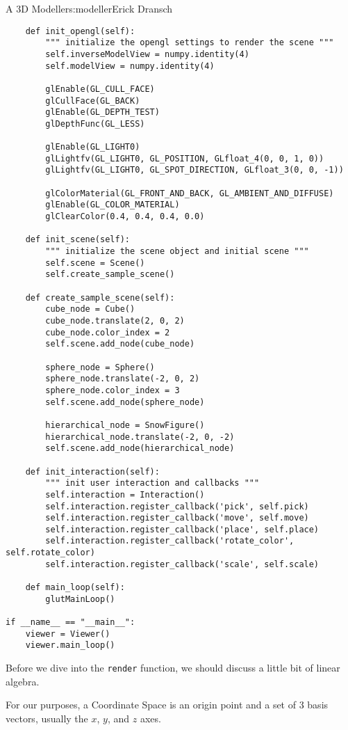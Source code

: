 \begin{aosachapter}{A 3D Modeller}{s:modeller}{Erick Dransch}
\begin{verbatim}
    def init_opengl(self):
        """ initialize the opengl settings to render the scene """
        self.inverseModelView = numpy.identity(4)
        self.modelView = numpy.identity(4)

        glEnable(GL_CULL_FACE)
        glCullFace(GL_BACK)
        glEnable(GL_DEPTH_TEST)
        glDepthFunc(GL_LESS)

        glEnable(GL_LIGHT0)
        glLightfv(GL_LIGHT0, GL_POSITION, GLfloat_4(0, 0, 1, 0))
        glLightfv(GL_LIGHT0, GL_SPOT_DIRECTION, GLfloat_3(0, 0, -1))

        glColorMaterial(GL_FRONT_AND_BACK, GL_AMBIENT_AND_DIFFUSE)
        glEnable(GL_COLOR_MATERIAL)
        glClearColor(0.4, 0.4, 0.4, 0.0)

    def init_scene(self):
        """ initialize the scene object and initial scene """
        self.scene = Scene()
        self.create_sample_scene()

    def create_sample_scene(self):
        cube_node = Cube()
        cube_node.translate(2, 0, 2)
        cube_node.color_index = 2
        self.scene.add_node(cube_node)

        sphere_node = Sphere()
        sphere_node.translate(-2, 0, 2)
        sphere_node.color_index = 3
        self.scene.add_node(sphere_node)

        hierarchical_node = SnowFigure()
        hierarchical_node.translate(-2, 0, -2)
        self.scene.add_node(hierarchical_node)

    def init_interaction(self):
        """ init user interaction and callbacks """
        self.interaction = Interaction()
        self.interaction.register_callback('pick', self.pick)
        self.interaction.register_callback('move', self.move)
        self.interaction.register_callback('place', self.place)
        self.interaction.register_callback('rotate_color', self.rotate_color)
        self.interaction.register_callback('scale', self.scale)

    def main_loop(self):
        glutMainLoop()

if __name__ == "__main__":
    viewer = Viewer()
    viewer.main_loop()
\end{verbatim}

Before we dive into the \texttt{render} function, we should discuss a
little bit of linear algebra.

\label{coordinate-space}

For our purposes, a Coordinate Space is an origin point and a set of 3
basis vectors, usually the $x$, $y$, and $z$ axes.


\end{aosachapter}
